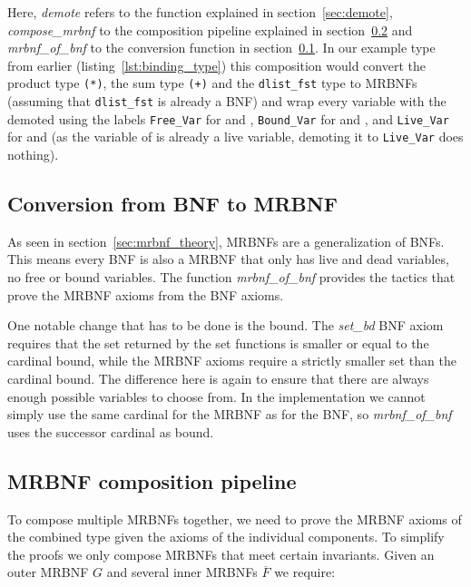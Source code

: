 Here, \textit{demote} refers to the function explained in section~\ref{sec:demote}, \textit{compose\_mrbnf} to the composition pipeline explained in section~\ref{sec:composition} and \textit{mrbnf\_of\_bnf} to the conversion function in section~\ref{sec:conversion}. In our example type from earlier (listing~\ref{lst:binding_type}) this composition would convert the product type \texttt{(*)}, the sum type \texttt{(+)} and the \texttt{dlist\_fst} type to \acp{MRBNF} (assuming that \texttt{dlist\_fst} is already a \ac{BNF}) and wrap every variable with the  demoted using the labels \texttt{Free\_Var} for  and , \texttt{Bound\_Var} for  and , and \texttt{Live\_Var} for  and  (as the variable of  is already a live variable, demoting it to \texttt{Live\_Var} does nothing).

\subsection{Conversion from \acs{BNF} to \acs{MRBNF}}\label{sec:conversion}

As seen in section~\ref{sec:mrbnf_theory}, \acp{MRBNF} are a generalization of \acp{BNF}. This means every \ac{BNF} is also a \ac{MRBNF} that only has live and dead variables, no free or bound variables. The function \textit{mrbnf\_of\_bnf} provides the tactics that prove the \ac{MRBNF} axioms from the \ac{BNF} axioms.

One notable change that has to be done is the bound. The \textit{set\_bd} \ac{BNF} axiom requires that the set returned by the set functions is smaller or equal to the cardinal bound, while the \ac{MRBNF} axioms require a strictly smaller set than the cardinal bound. The difference here is again to ensure that there are always enough possible variables to choose from. In the implementation we cannot simply use the same cardinal for the \ac{MRBNF} as for the \ac{BNF}, so \textit{mrbnf\_of\_bnf} uses the successor cardinal as bound.

\subsection{\acs{MRBNF} composition pipeline}\label{sec:composition}

To compose multiple \acp{MRBNF} together, we need to prove the \ac{MRBNF} axioms of the combined type given the axioms of the individual components. To simplify the proofs we only compose \acp{MRBNF} that meet certain invariants. Given an outer \ac{MRBNF} $G$ and several inner \acp{MRBNF} $\overline{F}$ we require:

